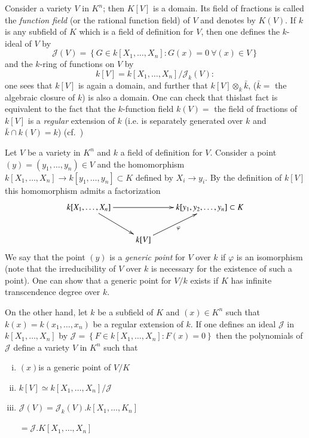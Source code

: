   Consider a variety $V$ in $K^n$; then $K[V]$ is a domain. Its field
  of fractions is called the \textit{function field} (or the rational
  function field) of $V$ and denotes by $K(V)$. If $k$ is any subfield of $K$ which is a
  field of definition for $V$, then one defines the $k$-ideal of $V$
  by 
  $$ 
  \mathcal{J} (V) = \left\{ G  \in   k [X_1,\ldots, X_n] : G(x) = 0~
  \forall (x)\in V \right\} 
  $$
  and the $k$-ring of functions on $V$ by
  $$ 
  k[V] = k [X_1,\ldots, X_n]/ \mathcal{J}_k (V):
  $$
  one sees that $k[V]$ is again a domain, and further that
  $k[V]\otimes _k \bar{k}$, ($\bar{k}= $ the algebraic closure of $k$)
  is also a domain. One can check that this\pageoriginale last fact is equivalent to
  the fact that the $k$-function field $k(V)=$ the field of fractions
  of $k[V]$ is a \textit{regular} extension of $k$ (i.e. is separately
  generated over $k$ and $\bar{k} \cap k(V) = k$) (cf.~\cite{4}) 

  Let $V$ be a variety in $K^n$ and $k$ a field of definition for
  $V$. Consider a point $ (y) = (y_1,\ldots, y_n) \in V$ and the
  homomorphism $k[X_1,\ldots, X_n] \rightarrow k[y_1,\ldots, y_n]\subset
  K$ defined by $X_i \to y_i$. By the definition of $k[V]$ this
  homomorphism admits a factorization  
\[
\xymatrix{k [X_1 ,\ldots, X_n] \ar[dr]\ar[rr] && k[y_1,y_2, \ldots,
    y_n]\subset K\\ 
  & k[V] \ar[ru]_\varphi& 
}
\]
  We say that the point $(y)$ is a \textit{generic point} for $V$ over
  $k$ if $\varphi$ is an isomorphism (note that the irreducibility of
  $V$ over $k$ is necessary for the existence of such a point). One
  can show that a generic point for $V/k$ exists if $K$ has infinite
  transcendence degree over $k$.  

  On the other hand, let $k$ be a subfield of $K$ and $(x) \in K^n$
  such that $k(x) = k(x_1,\ldots, x_n)$ be a regular extension of
  $k$. If one defines an ideal $\mathcal{J}$ in $k[X_1,\ldots,X_n]$ by
  $\mathcal{J} = \left\{ F  \in   k[X_1,\ldots,X_n] : F(x) = 0
  \right\}$ then the polynomials of $\mathcal{J}$ define a variety
  $V$ in $K^n$ such that 
  \begin{enumerate}[(i)]
  \item $(x)$\pageoriginale is a generic point of $V/K$
  \item $k[V]\simeq k[X_1,\ldots,X_n]/ \mathcal{J}$
  \item $\mathcal{J}(V) = \mathcal{J}_k (V). k[X_1,\ldots, K_n]$
    
    \qquad $= \mathcal{J}. K[X_1,\ldots,X_n]$
  \end{enumerate}

